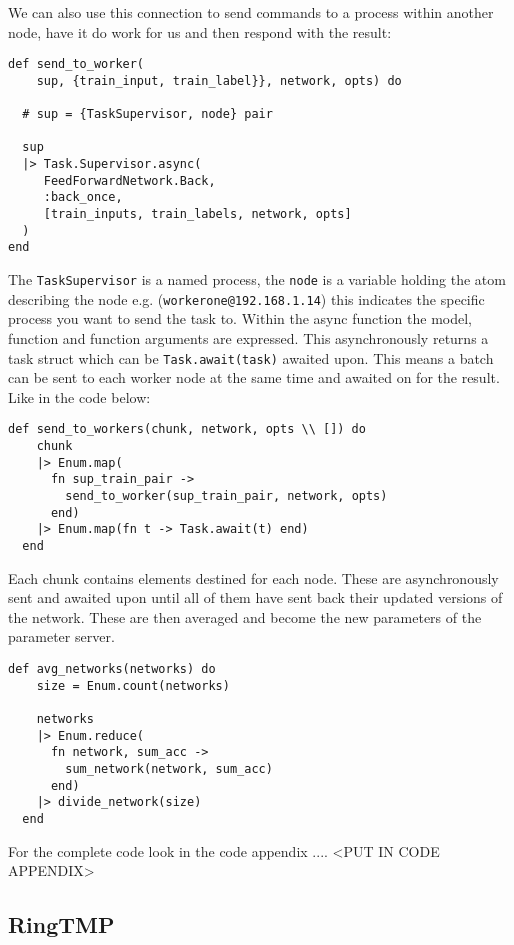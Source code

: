 We can also use this connection to send commands to a process within another
node, have it do work for us and then respond with the result:
\begin{lstlisting}[basicstyle=\linespread{0.8}\ttfamily\footnotesize]
def send_to_worker(
    sup, {train_input, train_label}}, network, opts) do

  # sup = {TaskSupervisor, node} pair

  sup
  |> Task.Supervisor.async(
     FeedForwardNetwork.Back,
     :back_once,
     [train_inputs, train_labels, network, opts]
  )
end
\end{lstlisting}
The \lstinline{TaskSupervisor} is a named process, the \lstinline{node} is a
variable holding the atom describing the node e.g.
(\lstinline{workerone@192.168.1.14}) this indicates the specific process you
want to send the task to. Within the async function the model, function and
function arguments are expressed. This asynchronously returns a task struct
which can be \lstinline{Task.await(task)} awaited upon. This means a batch can
be sent to each worker node at the same time and awaited on for the result. Like
in the code below:
\begin{lstlisting}[basicstyle=\linespread{0.8}\ttfamily\footnotesize]
  def send_to_workers(chunk, network, opts \\ []) do
    chunk
    |> Enum.map(
      fn sup_train_pair ->
        send_to_worker(sup_train_pair, network, opts)
      end)
    |> Enum.map(fn t -> Task.await(t) end)
  end
\end{lstlisting}
Each chunk contains elements destined for each node. These are asynchronously
sent and awaited upon until all of them have sent back their updated versions of
the network. These are then averaged and become the new parameters of the
parameter server.
\begin{lstlisting}[basicstyle=\linespread{0.8}\ttfamily\footnotesize]
  def avg_networks(networks) do
    size = Enum.count(networks)

    networks
    |> Enum.reduce(
      fn network, sum_acc ->
        sum_network(network, sum_acc)
      end)
    |> divide_network(size)
  end
\end{lstlisting}

For the complete code look in the code appendix .... <PUT IN CODE APPENDIX>

\subsection{RingTMP}


